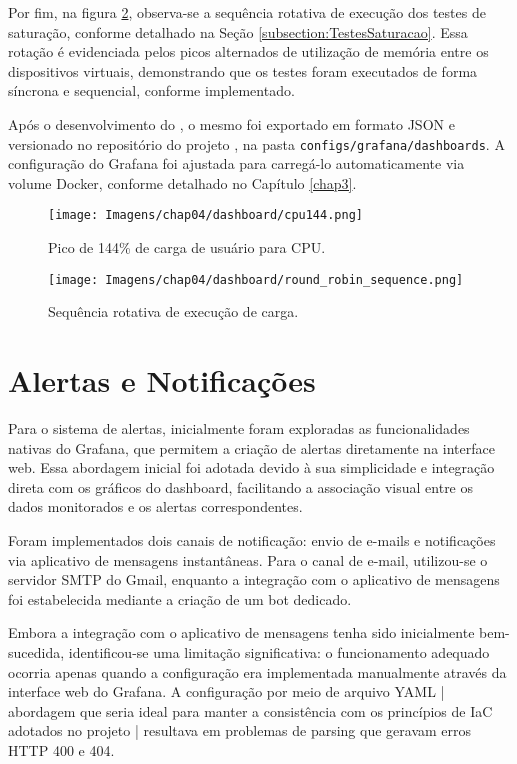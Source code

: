 Por fim, na figura \ref{fig:roundrobin}, observa-se a sequência rotativa de execução dos testes de saturação, conforme detalhado na Seção \ref{subsection:TestesSaturacao}. Essa rotação é evidenciada pelos picos alternados de utilização de memória entre os dispositivos virtuais, demonstrando que os testes foram executados de forma síncrona e sequencial, conforme implementado.

Após o desenvolvimento do , o mesmo foi exportado em formato JSON e versionado no repositório do projeto \citep{vitorcossetti2025}, na pasta \verb|configs/grafana/dashboards|. A configuração do Grafana foi ajustada para carregá-lo automaticamente via volume Docker, conforme detalhado no Capítulo \ref{chap3}.

\begin{figure}[H]
\centering
\setlength{\abovecaptionskip}{-20pt}
\texttt{[image: Imagens/chap04/dashboard/cpu144.png]}
\caption{Pico de 144\% de carga de usuário para CPU.}
\label{fig:dashboard-cpu144}
\end{figure}

\begin{figure}[H]
\centering
\setlength{\abovecaptionskip}{-20pt}
\texttt{[image: Imagens/chap04/dashboard/round\_robin\_sequence.png]}
\caption{Sequência rotativa de execução de carga.}
\label{fig:roundrobin}
\end{figure}

\section{Alertas e Notificações}
\label{section:Alertas}

Para o sistema de alertas, inicialmente foram exploradas as funcionalidades nativas do Grafana, que permitem a criação de alertas diretamente na interface web. Essa abordagem inicial foi adotada devido à sua simplicidade e integração direta com os gráficos do dashboard, facilitando a associação visual entre os dados monitorados e os alertas correspondentes.

Foram implementados dois canais de notificação: envio de e-mails e notificações via aplicativo de mensagens instantâneas. Para o canal de e-mail, utilizou-se o servidor SMTP do Gmail, enquanto a integração com o aplicativo de mensagens foi estabelecida mediante a criação de um bot dedicado.

Embora a integração com o aplicativo de mensagens tenha sido inicialmente bem-sucedida, identificou-se uma limitação significativa: o funcionamento adequado ocorria apenas quando a configuração era implementada manualmente através da interface web do Grafana. A configuração por meio de arquivo YAML | abordagem que seria ideal para manter a consistência com os princípios de IaC adotados no projeto | resultava em problemas de parsing que geravam erros HTTP 400 e 404.

